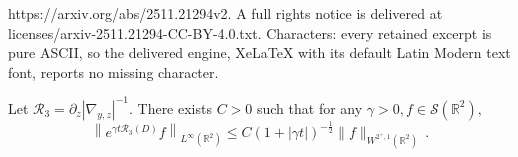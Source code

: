 \documentclass[10pt,a4paper]{amsart}
\let\pa=\partial
\newcommand\R{{\mathbb R}}
\newcommand{\beq}{\begin{equation}}
\newcommand{\eeq}{\end{equation}}
\begin{document}
https://arxiv.org/abs/2511.21294v2. A full rights notice is delivered at licenses/arxiv-2511.21294-CC-BY-4.0.txt. Characters: every retained excerpt is pure ASCII, so the delivered engine, XeLaTeX with its default Latin Modern text font, reports no missing character.
\begin{lemm}\label{App-dis-1}
	Let $\mathcal{R}_3=\pa_z|\nabla_{y,z}|^{-1}$.
	There exists $C>0$ such that for any $\gamma>0, f\in \mathcal{S}(\R^2),$
	\beq\label{dispersive}
	\left\| e^{\gamma t\mathcal{R}_3(D)}f \right\|_{L^\infty(\mathbb{R}^2)} \leq C (1+|\gamma t|)^{-\frac{1}{2}} \|f\|_{W^{2^{+},1}(\mathbb{R}^2)}\,.
	\eeq
\end{lemm}
\end{document}
